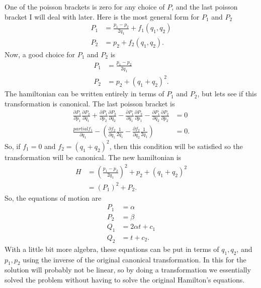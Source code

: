 \documentclass[10pt]{article}
\begin{document}
One of the poisson brackets is zero for any choice of $P$, and the last poisson
bracket I will deal with later.  Here is the most general form for $P_1$ and
$P_2$
\begin{align*}
  P_1 &= \frac{p_1-p_2}{2q_1}+f_1(q_1,q_2)\\
  P_2 &= p_2+f_2(q_1,q_2).
\end{align*}
Now, a good choice for $P_1$ and $P_2$ is
\begin{align*}
  P_1 &= \frac{p_1-p_2}{2q_1}\\
  P_2 &= p_2+(q_1+q_2)^2.
\end{align*}
The hamiltonian can be written entirely in terms of $P_1$ and $P_2$, but lets
see if this transformation is canonical.  The last poisson bracket is
\begin{align*}
  \frac{\partial P_1}{\partial p_1}\frac{\partial P_2}{\partial q_1} + \frac{\partial P_1}{\partial p_2}\frac{\partial P_2}{\partial q_2} - 
  \frac{\partial P_1}{\partial q_1}\frac{\partial P_2}{\partial p_1} - \frac{\partial P_1}{\partial q_2}\frac{\partial P_2}{\partial p_2}  
  &= 0\\
  \frac{partial f_1}{\partial q_1}-\left( \frac{\partial f_2}{\partial q_1}\frac{1}{2q_1} - \frac{\partial f_2}{\partial q_2}\frac{1}{2q_1} \right) &= 0.
\end{align*}
So, if $f_1=0$ and $f_2=(q_1+q_2)^2$, then this condition will be satisfied so the transformation will be canonical.
The new hamiltonian is
\begin{align*}
  H &= \left( \frac{p_1-p_2}{2q_1} \right)^2+p_2+(q_1+q_2)^2\\
    &= (P_1)^2+P_2.
\end{align*}
So, the equations of motion are
\begin{align*}
  P_1 &= \alpha\\
  P_2 &= \beta\\
  Q_1 &= 2\alpha t + c_1\\
  Q_2 &= t + c_2.
\end{align*}
With a little bit more algebra, these equations can be put in terms of 
$q_1,q_2$, and $p_1,p_2$ using the inverse of the original canonical 
transformation.  In this for the solution will probably not be linear,
so by doing a transformation we essentially solved the problem without
having to solve the original Hamilton's equations.
\end{document}
